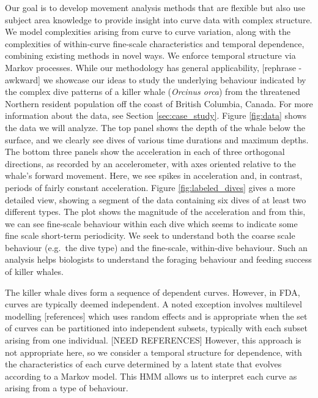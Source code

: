 Our goal is to develop movement analysis methods that are flexible but also use subject area knowledge to provide insight into curve data with complex structure.
We  model complexities arising  from curve to curve variation, along with the complexities of within-curve fine-scale characteristics and temporal dependence,
combining existing methods in novel ways.
We enforce temporal structure via Markov processes.  
While our methodology has general applicability, [rephrase - awkward] we  showcase our ideas to study the underlying behaviour indicated by the complex dive patterns of a killer whale (\textit{Orcinus orca}) from the threatened Northern resident population off the coast of British Columbia, Canada.  
For more information about the data, see Section \ref{sec:case_study}.
 Figure \ref{fig:data} shows the data we will analyze.
   The top panel shows the depth of the whale below the surface, and we clearly see dives of various time durations and maximum depths. 
The bottom three panels show the acceleration in each of three orthogonal directions,  as recorded by an accelerometer,   
with axes oriented relative to the whale's forward movement.
Here, we see spikes in acceleration and, in contrast, periods of fairly constant acceleration.
Figure {\ref{fig:labeled_dives}} gives a more detailed view, showing a segment of the data containing six dives of at least two different types.
The plot shows the magnitude of the acceleration and from this, we can see fine-scale behaviour within each dive which seems to indicate some fine scale short-term periodicity. 
We seek to understand both the coarse scale behaviour (e.g.~the dive type) and the fine-scale, within-dive behaviour.  
 Such an analysis helps biologists to understand the foraging behaviour and feeding success of killer whales. 

The killer whale dives form a sequence of dependent curves.   However, in FDA, curves are typically deemed independent.  
A noted exception involves multilevel modelling [references] which uses random effects and is appropriate when the set of curves can be partitioned into independent subsets, typically with each subset arising from one individual.  
[NEED REFERENCES]  
However, this approach is not appropriate here, so we consider a temporal structure for dependence, with the characteristics of each curve determined by a latent state that evolves according to a Markov model.  
This HMM allows us to interpret each curve as arising from a type of behaviour.

